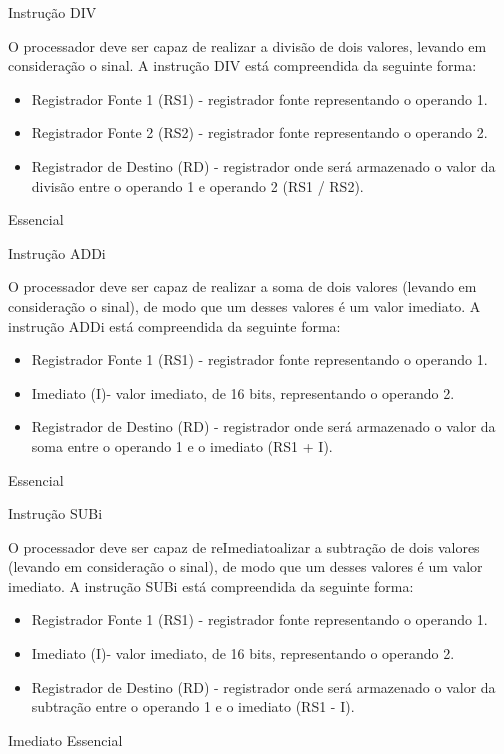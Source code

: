 \documentclass{article}
\begin{document}
\begin{functional}
       \requirement
      {Instrução DIV}
      {O processador deve ser capaz de realizar a divisão de dois valores, levando em consideração o sinal.
      A instrução DIV está compreendida da seguinte forma:\\
       \begin{itemize}
        \item Registrador Fonte 1 (RS1) - registrador fonte representando o operando 1.
        \item Registrador Fonte 2 (RS2) - registrador fonte representando o operando 2.
        \item Registrador de Destino (RD) - registrador onde será armazenado o valor da divisão entre o operando 1 e operando 2 (RS1 / RS2).
       \end{itemize}
       }
      {Essencial}
      
      \requirement
      {Instrução ADDi}
      {O processador deve ser capaz de realizar a soma de dois valores (levando em consideração o sinal), de modo que um desses valores é um valor imediato. A instrução ADDi está compreendida da seguinte forma:\\
       \begin{itemize}
        \item Registrador Fonte 1 (RS1) - registrador fonte representando o operando 1.
        \item Imediato (I)- valor imediato, de 16 bits, representando o operando 2.
        \item Registrador de Destino (RD) - registrador onde será armazenado o valor da soma entre o operando 1 e o imediato (RS1 + I).
       \end{itemize}
       }
      {Essencial}
      
      \requirement
      {Instrução SUBi}
      {O processador deve ser capaz de reImediatoalizar a subtração de dois valores (levando em consideração o sinal), de modo que um desses valores é um valor imediato. A instrução SUBi está compreendida da seguinte forma:\\
       \begin{itemize}
        \item Registrador Fonte 1 (RS1) - registrador fonte representando o operando 1.
        \item Imediato (I)- valor imediato, de 16 bits, representando o operando 2.
        \item Registrador de Destino (RD) - registrador onde será armazenado o valor da subtração entre o operando 1 e o imediato (RS1 - I).
       \end{itemize}
       }Imediato
      {Essencial}


\end{functional}
\end{document}
